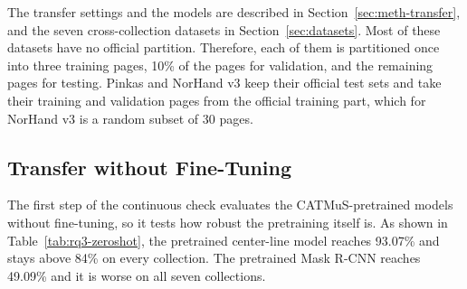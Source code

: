 The transfer settings and the models are described in Section~\ref{sec:meth-transfer}, and the seven cross-collection datasets in Section~\ref{sec:datasets}. Most of these datasets have no official partition. Therefore, each of them is partitioned once into three training pages, 10\% of the pages for validation, and the remaining pages for testing. Pinkas and NorHand v3 keep their official test sets and take their training and validation pages from the official training part, which for NorHand v3 is a random subset of 30 pages.

\FloatBarrier
\subsection{Transfer without Fine-Tuning}
\label{sec:results-rq3-zeroshot}

The first step of the continuous check evaluates the CATMuS-pretrained models without fine-tuning, so it tests how robust the pretraining itself is. As shown in Table~\ref{tab:rq3-zeroshot}, the pretrained center-line model reaches 93.07\% and stays above 84\% on every collection. The pretrained Mask R-CNN reaches 49.09\% and it is worse on all seven collections.

